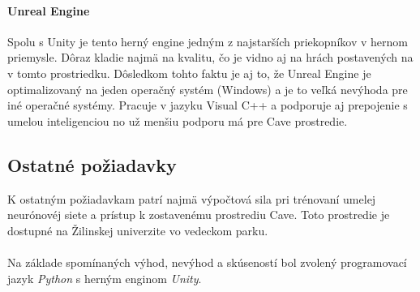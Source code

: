 \paragraph{Unreal Engine}\cite{game_engine_unreal_engine}
Spolu s Unity je tento herný engine jedným z najstarších priekopníkov v hernom priemysle.
Dôraz kladie najmä na kvalitu, čo je vidno aj na hrách postavených na v tomto prostriedku.
Dôsledkom tohto faktu je aj to, že Unreal Engine je optimalizovaný na jeden operačný systém (Windows) a je to veľká
nevýhoda pre iné operačné systémy.
Pracuje v jazyku Visual C++ a podporuje aj prepojenie s umelou inteligenciou no už menšiu podporu má pre Cave
prostredie.

\subsection{Ostatné požiadavky}\label{subsec:requirements-other}

K ostatným požiadavkam patrí najmä výpočtová sila pri trénovaní umelej neurónovéj siete a prístup k zostavenému
prostrediu Cave.
Toto prostredie je dostupné na Žilinskej univerzite vo vedeckom parku.
\\
\\
Na základe spomínaných výhod, nevýhod a skúseností bol zvolený programovací jazyk \emph{Python} s herným enginom
\emph{Unity}.

